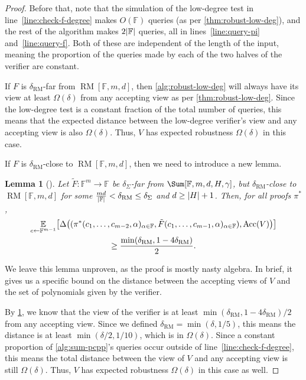 \documentclass[english,12pt]{reedthesis}
\theoremstyle{plain}
\newtheorem{lemma}[lemma]{Lemma}
\theoremstyle{definition}
\theoremstyle{remark}
\DeclareMathOperator{\Acc}{Acc}
\DeclareMathOperator{\RM}{RM}
\DeclarePairedDelimiter{\abs}{\lvert}{\rvert}
\begin{document}
\begin{proof}
  Before that, note that the simulation of the low-degree test in
  line~\ref{line:check-f-degree} makes $O(\mathbb{F})$ queries (as per
  \cref{thm:robust-low-deg}), and the rest of the algorithm makes
  $2\abs{\mathbb{F}}$ queries, all in lines~\ref{line:query-pi}
  and~\ref{line:query-f}. Both of these are independent of the length of the
  input, meaning the proportion of the queries made by each of the two halves of
  the verifier are constant.

  If $F$ is $\delta_{\RM}$-far from $\RM[\mathbb{F}, m, d]$, then
  \cref{alg:robust-low-deg} will always have its view at least $\Omega(\delta)$ from any
  accepting view as per \cref{thm:robust-low-deg}. Since the low-degree test is
  a constant fraction of the total number of queries, this means that the
  expected distance between the low-degree verifier's view and any accepting
  view is also $\Omega(\delta)$. Thus, $V$ has expected robustness $\Omega(\delta)$ in this case.

  If $F$ is $\delta_{\RM}$-close to $\RM[\mathbb{F}, m, d]$, then we need to
  introduce a new lemma.

  \begin{lemma}[{\cite[Lemma 4.4]{GOS25}}]\label{lem:sum-ev}
    Let $\tilde{F}\colon \mathbb{F}^{m} \rightarrow \mathbb{F}$ be $\delta_{\Sigma}$-far from
    $\Sum[\mathbb{F}, m, d, H, \gamma]$, but $\delta_{\RM}$-close to
    $\RM[\mathbb{F}, m, d]$ for some
    $\frac{md}{\abs{\mathbb{F}}} < \delta_{\RM} \le \delta_{\Sigma}$ and $d \ge \abs{H} + 1$. Then,
    for all proofs $\pi^{*}$,
    \begin{multline} %
      \underset{c \leftarrow \mathbb{F}^{m-1}}{\mathbb{E}}\mleft[
      \Delta\mleft(
      (\pi^{*}(c_{1}, \ldots, c_{m-2}, \alpha)_{\alpha \in \mathbb{F}}, \tilde{F}(c_{1}, \ldots, c_{m-1}, \alpha)_{\alpha \in \mathbb{F}}),
      \Acc(V)
      \mright)
      \mright] \\
      \ge \frac{\min(\delta_{\RM}, 1 - 4\delta_{\RM})}{2}.
    \end{multline}
  \end{lemma}

  We leave this lemma unproven, as the proof is mostly nasty algebra. In brief,
  it gives us a specific bound on the distance between the accepting views of
  $V$ and the set of polynomials given by the verifier.

  By \cref{lem:sum-ev}, we know that the view of the verifier is at least
  $\min(\delta_{\RM}, 1 - 4\delta_{\RM})/2$ from any accepting view. Since we defined
  $\delta_{\RM} = \min(\delta, 1/5)$, this means the distance is at least
  $\min(\delta/2, 1/10)$, which is in $\Omega(\delta)$. Since a constant proportion of
  \cref{alg:sum-pcpp}'s queries occur outside of line~\ref{line:check-f-degree},
  this means the total distance between the view of $V$ and any accepting view
  is still $\Omega(\delta)$. Thus, $V$ has expected robustness $\Omega(\delta)$ in this case as
  well.


\end{proof}
\end{document}
